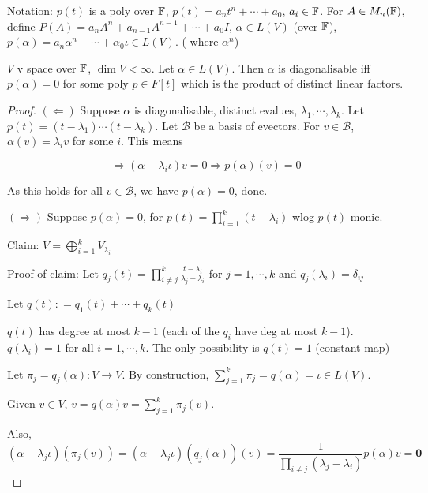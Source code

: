 \documentclass[a4paper]{article}
\begin{document}
Notation: $ p(t) $ is a poly over $ \mathbb{F} $, $ p(t) = a_{n}t^{n} + \cdots + a_{0} $, $ a_{i} \in \mathbb{F} $. For $ A \in M_{n}(\mathbb{F})$, define $ P(A) = a_{n}A^{n} + a_{n-1} A^{n-1} + \cdots+ a_{0} I $, $ \alpha \in L(V) $ (over $ \mathbb{F} $), $ p(\alpha) = a_{n}\alpha^{n} + \cdots + \alpha_{0} \iota \in L(V)  $. ( where $ \alpha^{n} $)

\begin{thm} $ V $ v space over $ \mathbb{F} $, $ \dim V < \infty $. Let $ \alpha \in L(V) $. Then $ \alpha $ is diagonalisable iff $ p(\alpha) = 0 $ for some poly $ p \in F[t] $ which is the product of distinct linear factors.
	
	
	
\end{thm}	
	\begin{proof}
		$ (\Leftarrow) $ Suppose $ \alpha $ is diagonalisable, distinct evalues, $ \lambda_{1},\cdots,\lambda_{k} $. Let $ p(t) = (t - \lambda_{1})\cdots(t - \lambda_{k}) $. Let $ \mathcal{B} $ be a basis of evectors. For $ v \in \mathcal{B} $, $ \alpha(v) = \lambda_{i} v $ for some $ i $. This means
		
		\[ \Rightarrow (\alpha - \lambda_{i} \iota ) v = 0 \Rightarrow p(\alpha)(v)  = 0 \]
		
		As this holds for all $ v \in \mathcal{B} $, we have $ p(\alpha) = 0 $, done.
		
		$ (\Rightarrow) $ Suppose $ p(\alpha) = 0 $, for $ p(t) = \prod_{i=1}^{k}  (t - \lambda_{i}) $ wlog $ p(t) $ monic.
		
		Claim: $ V = \bigoplus_{i=1}^{k} V_{\lambda_{i}} $
		
		Proof of claim: Let $ q_{j}(t) = \prod_{i \neq j}^{k} \frac{t - \lambda_{i}}{\lambda_{j} - \lambda_{i} }   $ for $ j = 1, \cdots, k $ and $ q_{j}(\lambda_{i}) = \delta_{ij} $
		
		Let $ q(t) : = q_{1}(t) + \cdots + q_{k}(t) $
		
		$ q(t) $ has degree at most $ k - 1 $ (each of the $ q_{i} $ have deg at most $ k - 1 $). $ q(\lambda_{i}) = 1 $ for all $ i = 1,\cdots,k $. The only possibility is $ q(t) = 1 $ (constant map)
		
		
		Let $ \pi_{j} = q_{j}(\alpha): V \to V $. By construction, $ \sum_{j=1}^{k} \pi_{j} = q(\alpha) = \iota \in L(V) $.
		
		Given $ v \in V $, $ v = q(\alpha)v = \sum_{j=1}^{k} \pi_{j}(v)  $.
		
		Also, \[ (\alpha - \lambda_{j}\iota) (\pi_{j}(v)) = (\alpha - \lambda_{j} \iota) (q_{j}(\alpha)) (v) = \frac{1}{\prod_{i \neq j}  (\lambda_{j} - \lambda_{i}) }  p(\alpha) v = \mathbf{0}  \]
		

\end{proof}
\end{document}
